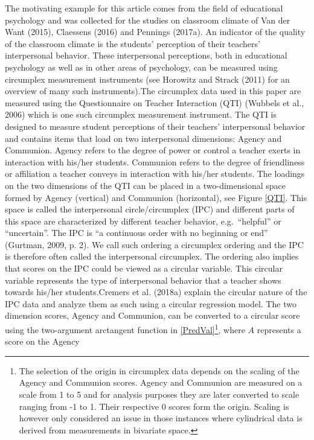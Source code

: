 \documentclass[man]{apa6}
\let\rmarkdownfootnote\footnote%
\def\footnote{\protect\rmarkdownfootnote}
\DeclareRobustCommand{\VANDER}[3]{#2}
\theoremstyle{definition}
\theoremstyle{definition}
\theoremstyle{definition}
\theoremstyle{remark}
\begin{document}
The motivating example for this article comes from the field of
educational psychology and was collected for the studies on classroom
climate of \VANDER{Want}{Van der}{van der} Want (2015), Claessens (2016)
and Pennings (2017a). An indicator of the quality of the classroom
climate is the students' perception of their teachers' interpersonal
behavior. These interpersonal perceptions, both in educational
psychology as well as in other areas of psychology, can be measured
using circumplex measurement instruments (see Horowitz and Strack (2011)
for an overview of many such instruments).\newline \indent The
circumplex data used in this paper are measured using the Questionnaire
on Teacher Interaction (QTI) (Wubbels et al., 2006) which is one such
circumplex measurement instrument. The QTI is designed to measure
student perceptions of their teachers' interpersonal behavior and
contains items that load on two interpersonal dimensions: Agency and
Communion. Agency refers to the degree of power or control a teacher
exerts in interaction with his/her students. Communion refers to the
degree of friendliness or affiliation a teacher conveys in interaction
with his/her students. The loadings on the two dimensions of the QTI can
be placed in a two-dimensional space formed by Agency (vertical) and
Communion (horizontal), see Figure \ref{QTI}. This space is called the
interpersonal circle/circumplex (IPC) and different parts of this space
are characterized by different teacher behavior, e.g.~\enquote{helpful}
or \enquote{uncertain}. The IPC is ``a continuous order with no
beginning or end'' (Gurtman, 2009, p. 2). We call such ordering a
circumplex ordering and the IPC is therefore often called the
interpersonal circumplex. The ordering also implies that scores on the
IPC could be viewed as a circular variable. This circular variable
represents the type of interpersonal behavior that a teacher shows
towards his/her students.\newline \indent Cremers et al. (2018a) explain
the circular nature of the IPC data and analyze them as such using a
circular regression model. The two dimension scores, Agency and
Communion, can be converted to a circular score using the two-argument
arctangent function in \eqref{PredVal}\footnote{The selection of
the origin in circumplex data depends on the scaling of the Agency and Communion
scores. Agency and Communion are measured on a scale from 1 to 5 and for
analysis purposes they are later converted to scale ranging from -1 to 1.  Their
respective 0 scores form the origin. Scaling is however only considered an issue
in those instances where cylindrical data is derived from measurements in
bivariate space.}, where \(A\) represents a score on the Agency
\end{document}
